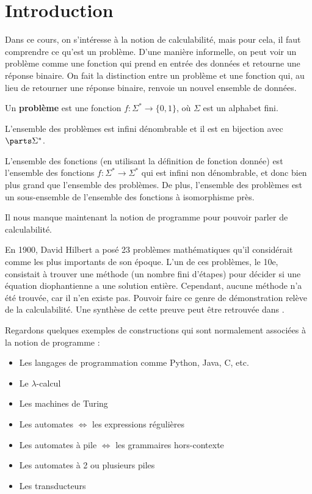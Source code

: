 
\section{Introduction}


Dans ce cours, on s'intéresse à la notion de calculabilité, mais pour cela, il faut comprendre ce qu'est un problème.
D'une manière informelle, on peut voir un problème comme une fonction qui prend en entrée des données et retourne une réponse binaire.
On fait la distinction entre un problème et une fonction qui, au lieu de retourner une réponse binaire, renvoie un nouvel ensemble de données.
\begin{definition}
	Un \textbf{problème} est une fonction $f: \Sigma^* \to \{0, 1\}$, où $\Sigma$ est un alphabet fini.
\end{definition}

\begin{remarque}
	L'ensemble des problèmes est infini dénombrable et il est en bijection avec $\parts \Sigma^*$.
\end{remarque}

\begin{remarque}
	L'ensemble des fonctions (en utilisant la définition de fonction donnée) est l'ensemble des fonctions $f: \Sigma^* \to \Sigma^*$ qui est infini non dénombrable,
	et donc bien plus grand que l'ensemble des problèmes. De plus, l'ensemble des problèmes est un sous-ensemble de l'ensemble des fonctions à isomorphisme près.
\end{remarque}

Il nous manque maintenant la notion de programme pour pouvoir parler de calculabilité.

En 1900, David Hilbert a posé 23 problèmes mathématiques qu'il considérait comme les plus importants de son époque. L'un de ces problèmes, le 10e, consistait à trouver
une méthode (un nombre fini d'étapes) pour décider si une équation diophantienne a une solution entière. Cependant, aucune méthode n'a été trouvée, car il n'en existe pas.
Pouvoir faire ce genre de démonstration relève de la calculabilité. Une synthèse de cette preuve peut être retrouvée dans \cite{Hilbert10}.

Regardons quelques exemples de constructions qui sont normalement associées à la notion de programme :

\begin{itemize}
	\item Les langages de programmation comme Python, Java, C, etc. 
	\item Le $\lambda$-calcul 
	\item Les machines de Turing 
	\item Les automates $\iff$ les expressions régulières 
	\item Les automates à pile $\iff$ les grammaires hors-contexte 
	\item Les automates à 2 ou plusieurs piles 
	\item Les transducteurs
\end{itemize}

